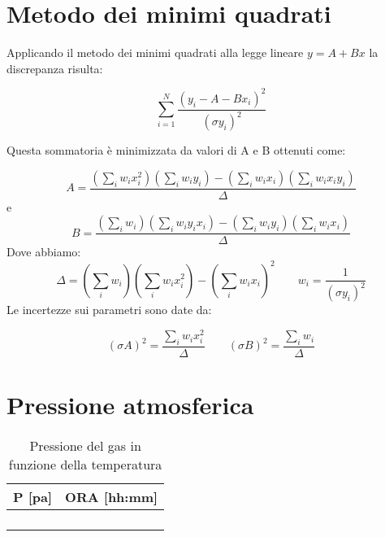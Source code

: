 \begin{appendices}

\section{Metodo dei minimi quadrati}
Applicando il metodo dei minimi quadrati alla legge lineare $ y = A + Bx$ la discrepanza risulta:

\begin{equation}
\displaystyle\sum_{i=1}^{N}\frac{(y_i -A-Bx_i)^2}{(\sigma y_i)^2}
\end{equation}
\hspace{-1.8em}

Questa sommatoria è minimizzata da valori di A e B ottenuti come:

\begin{equation}
\label{eq:a}
A = \frac{(\sum_i w_i x_i^2)(\sum_i w_i y_i)-(\sum_i w_i x_i)(\sum_i w_i x_i y_i)}{\Delta} 
\end{equation}
e
\begin{equation}
\label{eq:b}
B = \frac{(\sum_i w_i)(\sum_i w_i y_i x_i)-(\sum_i w_i y_i)(\sum_i w_i x_i)}{\Delta}
\end{equation}
Dove abbiamo:
\[ \Delta = (\sum_i w_i)(\sum_i w_i x_i^2)-(\sum_i w_i x_i)^2  \quad \quad  w_i = \frac{1}{(\sigma y_i)^2}\]
\hspace{-1.8em}
Le incertezze sui parametri sono date da:

\begin{equation} 
\label{eq:sasb}
(\sigma A)^2 = \frac{\sum_i w_i x_i^2}{\Delta}\quad \quad (\sigma B)^2 = \frac{\sum_i w_i}{\Delta}
\end{equation}

\section{Pressione atmosferica}

\begin{table}[H]
	\centering
	\begin{tabular}{|c|c|} \hline
		\textbf{P {[pa]} } & \textbf{ORA {[hh:mm]} }  \\ \hline
		 &   \\ \hline
		 &   \\ \hline
		 &   \\ \hline
		 &   \\ \hline
	\end{tabular}
	\caption{Pressione del gas in funzione della temperatura}
\end{table}


\end{appendices}
